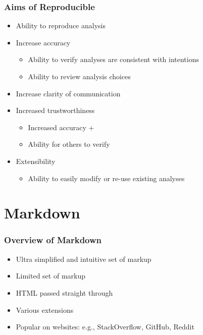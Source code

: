 \begin{frame}\frametitle{Aims of Reproducible}

\begin{itemize}
\item
  Ability to reproduce analysis
\item
  Increase accuracy

  \begin{itemize}
  \item
    Ability to verify analyses are consistent with intentions
  \item
    Ability to review analysis choices
  \end{itemize}
\item
  Increase clarity of communication
\item
  Increased trustworthiness

  \begin{itemize}
  \item
    Increased accuracy +
  \item
    Ability for others to verify
  \end{itemize}
\item
  Extensibility

  \begin{itemize}
  \item
    Ability to easily modify or re-use existing analyses
  \end{itemize}
\end{itemize}

\end{frame}

\section{Markdown}

\begin{frame}\frametitle{Overview of Markdown}

\begin{itemize}
\item
  Ultra simplified and intuitive set of markup
\item
  Limited set of markup
\item
  HTML passed straight through
\item
  Various extensions
\item
  Popular on websites: e.g., StackOverflow, GitHub, Reddit
\end{itemize}

\end{frame}

